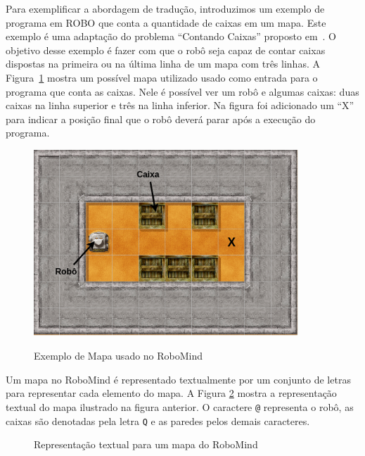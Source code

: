Para exemplificar a abordagem de tradução, introduzimos um exemplo de programa em ROBO que conta a quantidade de caixas em um mapa. Este exemplo é uma adaptação do problema ``Contando Caixas'' proposto em~\cite{furb}. O objetivo desse exemplo é fazer com que o robô seja capaz de contar caixas dispostas na primeira ou na última linha de um mapa com três linhas.  A Figura~\ref{fig:map} mostra um possível mapa utilizado usado como entrada para o programa que conta as caixas. Nele é possível ver um robô e algumas caixas: duas caixas na linha superior e três na linha inferior. Na figura foi adicionado um ``X'' para indicar a posição final que o robô deverá parar após a execução do programa. 

\begin{figure}[h]
\centering
\caption{Exemplo de Mapa usado no RoboMind}
\includegraphics[height=7cm]{figuras/map2.png}
\label{fig:map}
\end{figure}

Um mapa no RoboMind é representado textualmente por um conjunto de letras para representar cada elemento do mapa. A Figura \ref{fig:maprobo} mostra a representação textual do mapa ilustrado na figura anterior. O caractere \texttt{@} representa o robô, as caixas são denotadas pela letra \texttt{Q} e as paredes pelos demais caracteres.

\begin{figure}[h]
\centering
\caption{Representação textual para um mapa do RoboMind}

\label{fig:maprobo}
\end{figure}



